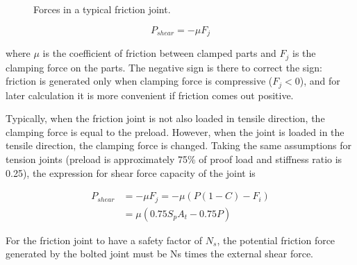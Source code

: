 \documentclass[
10pt,
a4paper,
openany,
svgnames,
]{book}
\begin{document}
\begin{figure}[h]
  \centering
  \caption{Forces in a typical friction joint.}
\end{figure}

\[P_{shear} = -\mu F_j\]

where $\mu$ is the coefficient of friction between clamped parts and $F_j$ is the clamping force on the parts. The negative sign is there to correct the sign: friction is generated only when clamping force is compressive ($F_j < 0$), and for later calculation it is more convenient if friction comes out positive.

Typically, when the friction joint is not also loaded in tensile direction, the clamping force is equal to the preload. However, when the joint is loaded in the tensile direction, the clamping force is changed. Taking the same assumptions for tension joints (preload is approximately 75\% of proof load and stiffness ratio is 0.25), the expression for shear force capacity of the joint is 

\begin{align*}
  P_{shear} &= -\mu F_j = -\mu \left( P(1 - C) - F_i \right) \\
            &= \mu (0.75S_pA_t - 0.75P)
\end{align*}

For the friction joint to have a safety factor of $N_s$, the potential friction force generated by the bolted joint must be Ns times the external shear force.
\end{document}
